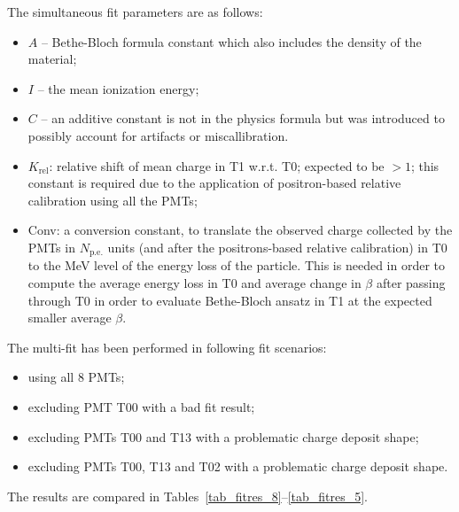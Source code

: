 \documentclass{article}[a4paper,12pt]
\begin{document}
The simultaneous fit parameters are as follows:
\begin{itemize}
  \item $A$ -- Bethe-Bloch formula constant which also includes the density of the material;
  \item $I$ -- the mean ionization energy;
  \item $C$ -- an additive constant is not in the physics formula but was introduced to possibly account for artifacts or miscallibration.
  \item $K_\mathrm{rel}$: 	relative shift of mean charge in T1 w.r.t. T0; expected to be $> 1$; this constant is required due to the application of positron-based relative calibration using all the PMTs;
  \item Conv: a conversion constant, to translate the observed charge collected by the PMTs in $N_\mathrm{p.e.}$ units (and after the positrons-based relative calibration) in T0 to the MeV level of the energy loss of the particle. This is needed in order to compute the average energy loss in T0 and average change in $\beta$ after passing through T0 in order to evaluate Bethe-Bloch ansatz in T1 at the expected smaller average $\beta$.
\end{itemize}

The multi-fit has been performed in following fit scenarios:
\begin{itemize}
 \item[(a)] using all 8 PMTs;
 \item[(b)] excluding PMT T00 with a bad fit result;
 \item[(c)] excluding PMTs T00 and T13 with a problematic charge deposit shape;
 \item[(d)] excluding PMTs T00, T13 and T02 with a problematic charge deposit shape.
\end{itemize}
The results are compared in Tables~\ref{tab_fitres_8}--\ref{tab_fitres_5}.


\end{document}
